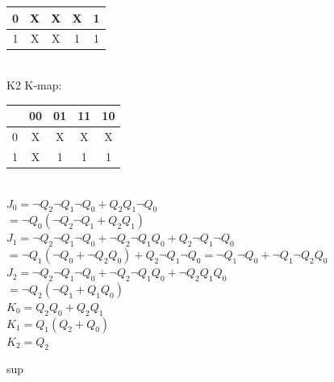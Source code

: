 \documentclass{article}
\begin{document}
{\begin{tabular}{|c|c|c|c|c|}
        \hline
        0 & X  & X  & X  & 1  \\
        \hline
        1 & X  & X  & 1  & 1  \\
        \hline
    \end{tabular} \\
    \linebreak
    K2 K-map: \\
    \begin{tabular}{|c|c|c|c|c|}
        \hline
          & 00 & 01 & 11 & 10 \\
        \hline
        0 & X  & X  & X  & X  \\
        \hline
        1 & X  & 1  & 1  & 1  \\
        \hline
    \end{tabular} \\
    $J_0 = \neg Q_2 \neg Q_1 \neg Q_0 + Q_2 Q_1 \neg Q_0$                                                      \\
    $= \neg Q_0 (\neg Q_2 \neg Q_1 + Q_2 Q_1)$                                                                 \\
    $J_1 = \neg Q_2 \neg Q_1 \neg Q_0 + \neg Q_2 \neg Q_1 Q_0 + Q_2 \neg Q_1 \neg Q_0$                         \\
    $= \neg Q_1 (\neg Q_0 + \neg Q_2 Q_0) + Q_2 \neg Q_1 \neg Q_0 = \neg Q_1 \neg Q_0 + \neg Q_1 \neg Q_2 Q_0$ \\
    $J_2 = \neg Q_2 \neg Q_1 \neg Q_0 + \neg Q_2 \neg Q_1 Q_0 + \neg Q_2 Q_1 Q_0$                              \\
    $= \neg Q_2(\neg Q_1 + Q_1 Q_0)$                                                                           \\
    $K_0 = Q_2 Q_0 + Q_2 Q_1$                                                                                  \\
    $K_1 = Q_1 (Q_2 + Q_0)$                                                                                    \\
    $K_2 = Q_2$                                                                                                \\
}

 {
    sup
}
\end{document}
